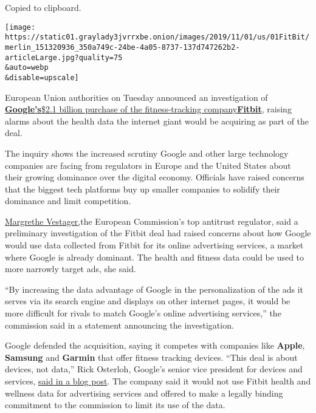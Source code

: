 Copied to clipboard.

\texttt{[image: https://static01.graylady3jvrrxbe.onion/images/2019/11/01/us/01FitBit/merlin\_151320936\_350a749c-24be-4a05-8737-137d747262b2-articleLarge.jpg?quality=75\\\&auto=webp\\\&disable=upscale]}

European Union authorities on Tuesday announced an investigation of
\textbf{\href{https://www.nytimes3xbfgragh.onion/2019/11/01/technology/google-fitbit.html}{Google's}}\href{https://www.nytimes3xbfgragh.onion/2019/11/01/technology/google-fitbit.html}{\$2.1
billion purchase of the fitness-tracking
company}\textbf{\href{https://www.nytimes3xbfgragh.onion/2019/11/01/technology/google-fitbit.html}{Fitbit}},
raising alarms about the health data the internet giant would be
acquiring as part of the deal.

The inquiry shows the increased scrutiny Google and other large
technology companies are facing from regulators in Europe and the United
States about their growing dominance over the digital economy. Officials
have raised concerns that the biggest tech platforms buy up smaller
companies to solidify their dominance and limit competition.

\href{https://ec.europa.eu/commission/presscorner/detail/en/ip_20_1446}{Margrethe
Vestager,}the European Commission's top antitrust regulator, said a
preliminary investigation of the Fitbit deal had raised concerns about
how Google would use data collected from Fitbit for its online
advertising services, a market where Google is already dominant. The
health and fitness data could be used to more narrowly target ads, she
said.

``By increasing the data advantage of Google in the personalization of
the ads it serves via its search engine and displays on other internet
pages, it would be more difficult for rivals to match Google's online
advertising services,'' the commission said in a statement announcing
the investigation.

Google defended the acquisition, saying it competes with companies like
\textbf{Apple}, \textbf{Samsung} and \textbf{Garmin} that offer fitness
tracking devices. ``This deal is about devices, not data,'' Rick
Osterloh, Google's senior vice president for devices and services,
\href{https://blog.google/around-the-globe/google-europe/update-fitbit/}{said
in a blog post}. The company said it would not use Fitbit health and
wellness data for advertising services and offered to make a legally
binding commitment to the commission to limit its use of the data.

